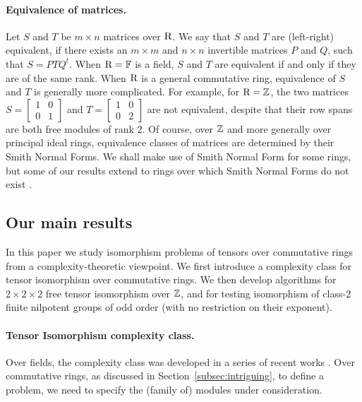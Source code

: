 \paragraph{Equivalence of matrices.} Let $S$ and $T$ be $m\times n$ matrices over $\mathrm{R}$. We say that $S$ and $T$ are (left-right) equivalent, if there exists an $m\times m$ and $n\times n$ invertible matrices $P$ and $Q$, such that $S=PTQ^t$. When $\mathrm{R}=\mathbb{F}$ is a field, $S$ and $T$ are equivalent if and only if they are of the same rank. When $\mathrm{R}$ is a general commutative ring, equivalence of $S$ and $T$ is generally more complicated. For example, for $\mathrm{R}=\mathbb{Z}$, the two matrices $S=\begin{bmatrix}
	1 & 0 \\
	0 & 1
\end{bmatrix}$ and $T=\begin{bmatrix}
	1 & 0 \\
	0 & 2
\end{bmatrix}$ are not equivalent, despite that their row spans are both free modules of rank $2$. Of course, over $\mathbb{Z}$ and more generally over principal ideal rings, equivalence classes of matrices are determined by their Smith Normal Forms. We shall make use of Smith Normal Form for some rings, but some of our results extend to rings over which Smith Normal Forms do not exist \cite{Sta16}.

\subsection{Our main results}

In this paper we study isomorphism problems of tensors over commutative rings from a  complexity-theoretic viewpoint. We first introduce a complexity class for tensor isomorphism over commutative rings. We then develop algorithms for $2\times 2\times 2$ free tensor isomorphism over $\mathbb{Z}$, and for testing isomorphism of class-$2$ finite nilpotent groups of odd order (with no restriction on their exponent). 

\paragraph{Tensor Isomorphism complexity class.} Over fields, the \TIlong complexity class was developed in a series of recent works \cite{TI1,TI2,TI3,TI4,GQT}. Over commutative rings, as discussed in Section~\ref{subsec:intriguing}, to define a \TIlong problem, we need to specify the (family of) modules under consideration. 

